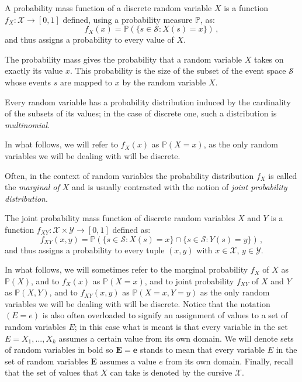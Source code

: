 \begin{definition}
	A probability mass function of a discrete random variable $X$ is a function $f_X: \mathcal{X} \rightarrow [0,1]$ defined, using a probability measure $\mathbb{P}$, as:
\begin{equation*}
	f_X(x) = \mathbb{P}(\{s \in \mathcal{S} : X(s)=x\}) \,,
\end{equation*}
and thus assigns a probability to every value of $X$.
\end{definition}
The probability mass gives the probability that a random variable $X$ takes on exactly its value $x$.
This probability is the size of the subset of the event space $\mathcal{S}$ whose events $s$ are mapped to $x$ by the random variable $X$.

Every random variable has a probability distribution induced by the cardinality of the subsets of its values; in the case of discrete one, such a distribution is \textit{multinomial}.

In what follows, we will refer to $f_X(x)$ as $\mathbb{P}(X=x)$, as the only random variables we will be dealing with will be discrete.

Often, in the context of random variables the probability distribution $f_X$ is called the \textit{marginal of $X$} and is usually contrasted with the notion of \textit{joint probability distribution}.
\begin{definition}
	The joint probability mass function of discrete random variables $X$ and $Y$ is a function $f_{XY} : \mathcal{X} \times \mathcal{Y} \rightarrow [0,1]$ defined as:
	\begin{equation*}
		f_{XY}(x,y) = \mathbb{P}( \{s \in \mathcal{S} : X(s)=x \} \cap \{ s \in \mathcal{S} : Y(s)=y\} ) \,,
	\end{equation*}
	and thus assigns a probability to every tuple $(x,y)$ with $x \in \mathcal{X}$, $y \in \mathcal{Y}$.
\end{definition}

In what follows, we will sometimes refer to the marginal probability $f_X$ of $X$ as $\mathbb{P}(X)$, and to $f_X(x)$ as $\mathbb{P}(X = x)$, and to joint probability $f_{XY}$ of $X$ and $Y$ as $\mathbb{P}(X,Y)$, and to $f_{XY}(x,y)$ as $\mathbb{P}(X=x,Y=y)$ as the only random variables we will be dealing with will be discrete.
Notice that the notation $(E = e)$ is also often overloaded to signify an assignment of values to a set of random variables $E$; in this case what is meant is that every variable in the set $E = {X_1,...,X_k}$ assumes a certain value from its own domain. 
We will denote sets of random variables in bold so $\boldsymbol{E} = \boldsymbol{e}$ stands to mean that every variable $E$ in the set of random variables $\boldsymbol{E}$ assumes a value $e$ from its own domain. 
Finally, recall that the set of values that $X$ can take is denoted by the cursive $\mathcal{X}$.


